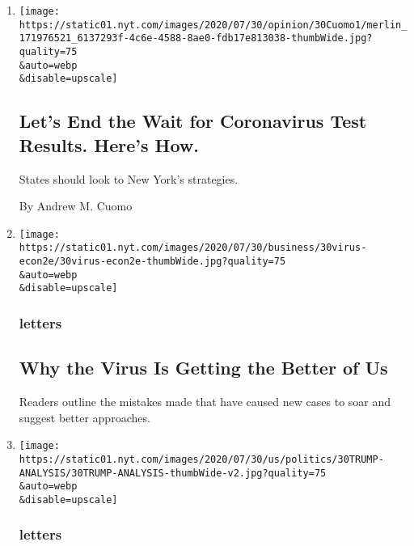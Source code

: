 \begin{enumerate}
\def\labelenumi{\arabic{enumi}.}
\item
  \href{/2020/07/31/opinion/coronavirus-testing-cuomo.html}{}

  \texttt{[image: https://static01.nyt.com/images/2020/07/30/opinion/30Cuomo1/merlin\_171976521\_6137293f-4c6e-4588-8ae0-fdb17e813038-thumbWide.jpg?quality=75\\\&auto=webp\\\&disable=upscale]}

  \hypertarget{lets-end-the-wait-for-coronavirus-test-results-heres-how}{%
  \subsection{Let's End the Wait for Coronavirus Test Results. Here's
  How.}\label{lets-end-the-wait-for-coronavirus-test-results-heres-how}}

  States should look to New York's strategies.

  By Andrew M. Cuomo
\item
  \href{/2020/07/31/opinion/letters/coronavirus-economy.html}{}

  \texttt{[image: https://static01.nyt.com/images/2020/07/30/business/30virus-econ2e/30virus-econ2e-thumbWide.jpg?quality=75\\\&auto=webp\\\&disable=upscale]}

  \hypertarget{letters}{%
  \subsubsection{letters}\label{letters}}

  \hypertarget{why-the-virus-is-getting-the-better-of-us}{%
  \subsection{Why the Virus Is Getting the Better of
  Us}\label{why-the-virus-is-getting-the-better-of-us}}

  Readers outline the mistakes made that have caused new cases to soar
  and suggest better approaches.
\item
  \href{/2020/07/31/opinion/letters/trump-election.html}{}

  \texttt{[image: https://static01.nyt.com/images/2020/07/30/us/politics/30TRUMP-ANALYSIS/30TRUMP-ANALYSIS-thumbWide-v2.jpg?quality=75\\\&auto=webp\\\&disable=upscale]}

  \hypertarget{letters-1}{%
  \subsubsection{letters}\label{letters-1}}


\end{enumerate}
